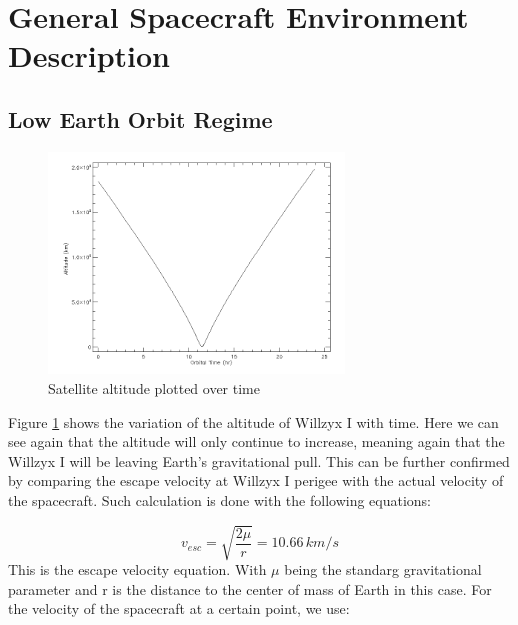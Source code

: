 \clearpage

\section{\label{sec:general}General Spacecraft Environment Description}

\subsection{Low Earth Orbit Regime}

\begin{figure}[h!]
\centering
\includegraphics[width=0.7\textwidth]{figures/AltVSTime.png}
\caption{Satellite altitude plotted over time}
\label{AltPlot}
\end{figure}

Figure \ref{AltPlot} shows the variation of the  altitude of Willzyx I with time. Here we can see again that the altitude will only continue to increase, meaning again that the Willzyx I will be leaving Earth's gravitational pull. This can be further confirmed by comparing the escape velocity at Willzyx I perigee with the actual velocity of the spacecraft. Such calculation is done with the following equations:

\begin{equation}
v_{esc}=\sqrt{\frac{2\mu}{r}}=10.66\,km/s
\label{Vesc}
\end{equation}
This is the escape velocity equation. With $\mu$ being the standarg gravitational parameter and r is the distance to the center of mass of Earth in this case. For the velocity of the spacecraft at a certain point, we use:

